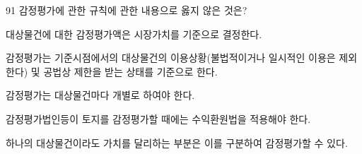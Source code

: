 \begin{question}{91}
감정평가에 관한 규칙에 관한 내용으로 옳지 않은 것은?
\begin{choices}
  \item 대상물건에 대한 감정평가액은 시장가치를 기준으로 결정한다.
  \item 감정평가는 기준시점에서의 대상물건의 이용상황(불법적이거나 일시적인 이용은 제외한다) 및 공법상 제한을 받는 상태를 기준으로 한다.
  \item 감정평가는 대상물건마다 개별로 하여야 한다.
  \item 감정평가법인등이 토지를 감정평가할 때에는 수익환원법을 적용해야 한다.
  \item 하나의 대상물건이라도 가치를 달리하는 부분은 이를 구분하여 감정평가할 수 있다.
\end{choices}
\end{question}
